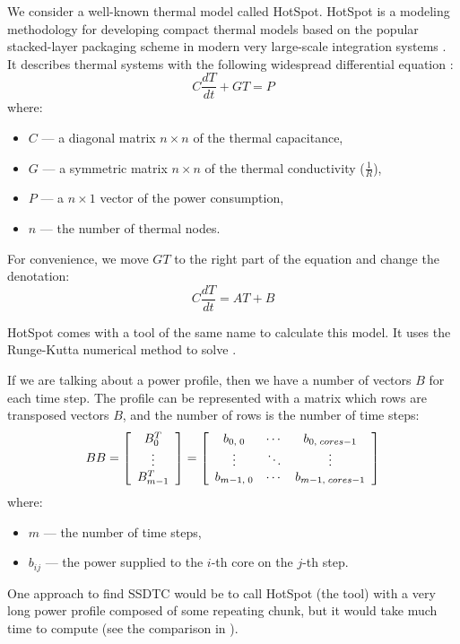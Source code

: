 We consider a well-known thermal model called HotSpot. HotSpot is a modeling methodology for developing compact thermal models based on the popular stacked-layer packaging scheme in modern very large-scale integration systems \cite{huang2006}. It describes thermal systems with the following widespread differential equation \cite{rao2008}:
\[
  C \frac{dT}{dt} + GT = P
\]
where:
\begin{itemize}
  \item $C$ --- a diagonal matrix $n \times n$ of the thermal capacitance,
  \item $G$ --- a symmetric matrix $n \times n$ of the thermal conductivity ($\frac{1}{R}$),
  \item $P$ --- a $n \times 1$ vector of the power consumption,
  \item $n$ --- the number of thermal nodes.
\end{itemize}

For convenience, we move $GT$ to the right part of the equation and change the denotation:
\begin{equation} \label{eq:initial}
  C \frac{dT}{dt} = AT + B
\end{equation}

HotSpot comes with a tool of the same name to calculate this model. It uses the Runge-Kutta numerical method to solve .

If we are talking about a power profile, then we have a number of vectors $B$ for each time step. The profile can be represented with a matrix which rows are transposed vectors $B$, and the number of rows is the number of time steps:
\[
  BB =
    \left[
      \begin{array}{c}
        B_0^T \\
        \vdots \\
        B_{m-1}^T
      \end{array}
    \right] =
    \left[
      \begin{array}{ccc}
        b_{0,\;0} & \cdots & b_{0,\;cores-1} \\
        \vdots & \ddots & \vdots \\
        b_{m-1,\;0} & \cdots & b_{m-1,\;cores-1}
      \end{array}
    \right]
\]
where:
\begin{itemize}
  \item $m$ --- the number of time steps,
  \item $b_{ij}$ --- the power supplied to the $i$-th core on the $j$-th step.
\end{itemize}

One approach to find SSDTC would be to call HotSpot (the tool) with a very long power profile composed of some repeating chunk, but it would take much time to compute (see the comparison in ).
